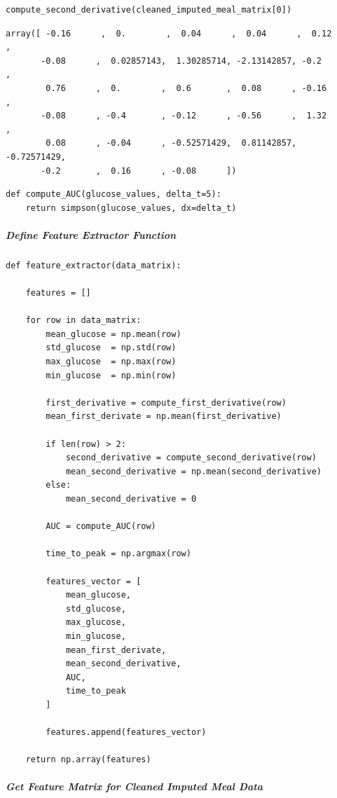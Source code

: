 \begin{verbatim}
compute_second_derivative(cleaned_imputed_meal_matrix[0])
\end{verbatim}

\begin{verbatim}
array([ -0.16      ,  0.        ,  0.04      ,  0.04      ,  0.12      ,
       -0.08      ,  0.02857143,  1.30285714, -2.13142857, -0.2       ,
        0.76      ,  0.        ,  0.6       ,  0.08      , -0.16      ,
       -0.08      , -0.4       , -0.12      , -0.56      ,  1.32      ,
        0.08      , -0.04      , -0.52571429,  0.81142857, -0.72571429,
       -0.2       ,  0.16      , -0.08      ])
\end{verbatim}

\begin{verbatim}
def compute_AUC(glucose_values, delta_t=5):
    return simpson(glucose_values, dx=delta_t)
\end{verbatim}

\subparagraph{Define Feature Extractor Function}

\begin{verbatim}
def feature_extractor(data_matrix):

    features = []

    for row in data_matrix:
        mean_glucose = np.mean(row)
        std_glucose  = np.std(row)
        max_glucose  = np.max(row)
        min_glucose  = np.min(row)
        
        first_derivative = compute_first_derivative(row)
        mean_first_derivate = np.mean(first_derivative)

        if len(row) > 2:
            second_derivative = compute_second_derivative(row)
            mean_second_derivative = np.mean(second_derivative)
        else:
            mean_second_derivative = 0

        AUC = compute_AUC(row)

        time_to_peak = np.argmax(row)

        features_vector = [
            mean_glucose,
            std_glucose,
            max_glucose,
            min_glucose,
            mean_first_derivate,
            mean_second_derivative,
            AUC,
            time_to_peak
        ]

        features.append(features_vector)
    
    return np.array(features)
\end{verbatim}

\subparagraph{Get Feature Matrix for Cleaned Imputed Meal Data}


